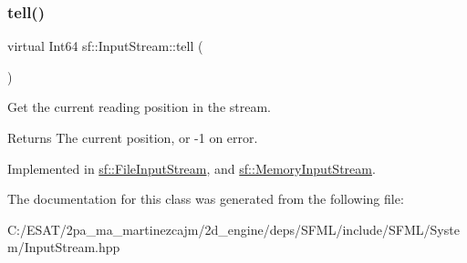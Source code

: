 \mbox{\label{classsf_1_1_input_stream_a599515b9ccdbddb6fef5a98424fd559c}} 
\subsubsection{\texorpdfstring{tell()}{tell()}}
{\footnotesize\ttfamily virtual Int64 sf\+::\+Input\+Stream\+::tell (\begin{DoxyParamCaption}{ }\end{DoxyParamCaption})\hspace{0.3cm}{\ttfamily [pure virtual]}}



Get the current reading position in the stream. 

\begin{DoxyReturn}{Returns}
The current position, or -\/1 on error. 
\end{DoxyReturn}


Implemented in \hyperlink{classsf_1_1_file_input_stream_a768c5fdb3be79e2d71d1bce911f8741c}{sf\+::\+File\+Input\+Stream}, and \hyperlink{classsf_1_1_memory_input_stream_a7ad4bdf721f29de8f66421ff29e23ee4}{sf\+::\+Memory\+Input\+Stream}.



The documentation for this class was generated from the following file\+:\begin{DoxyCompactItemize}
\item 
C\+:/\+E\+S\+A\+T/2pa\+\_\+ma\+\_\+martinezcajm/2d\+\_\+engine/deps/\+S\+F\+M\+L/include/\+S\+F\+M\+L/\+System/Input\+Stream.\+hpp\end{DoxyCompactItemize}
